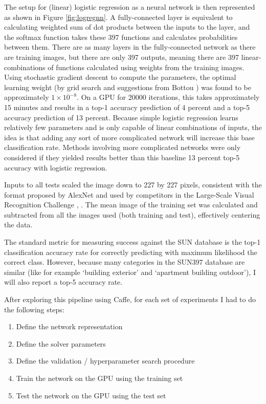 \documentclass[10pt]{article}
\begin{document}
The setup for (linear) logistic regression as a neural network is then represented as shown in Figure \ref{fig:logregnn}. A fully-connected layer is equivalent to calculating weighted sum of dot products between the inputs to the layer, and the softmax function takes these 397 functions and calculates probabilities between them. There are as many layers in the fully-connected network as there are training images, but there are only 397 outputs, meaning there are 397 linear-combinations of functions calculated using weights from the training images. Using stochastic gradient descent to compute the parameters, the optimal learning weight (by grid search and suggestions from Bottou \cite{bottou_large-scale_2010}) was found to be approximately $1 \times 10^{-8}$. On a GPU for 20000 iterations, this takes approximately 15 minutes and results in a top-1 accuracy prediction of 4 percent and a top-5 accuracy prediction of 13 percent. Because simple logistic regression learns relatively few parameters and is only capable of linear combinations of inputs, the idea is that adding any sort of more complicated network will increase this base classification rate. Methods involving more complicated networks were only considered if they yielded results better than this baseline 13 percent top-5 accuracy with logistic regression. 

Inputs to all tests scaled the image down to 227 by 227 pixels, consistent with the format proposed by AlexNet and used by competitors in the Large-Scale Visual Recognition Challenge \cite{krizhevsky_imagenet_2012}, \cite{russakovsky_imagenet_2014}. The mean image of the training set was calculated and subtracted from all the images used (both training and test), effectively centering the data.

The standard metric for measuring success against the SUN database is the top-1 classification accuracy rate for correctly predicting with maximum likelihood the correct class. However, because many categories in the SUN397 database are similar (like for example `building exterior' and `apartment building outdoor'), I will also report a top-5 accuracy rate.

After exploring this pipeline using Caffe, for each set of experiments I had to do the following steps: 

\begin{enumerate}
	\item Define the network representation
	\item Define the solver parameters
	\item Define the validation / hyperparameter search procedure
	\item Train the network on the GPU using the training set
	\item Test the network on the GPU using the test set
\end{enumerate}
\end{document}
